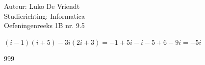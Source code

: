 \documentclass[a4paper]{article}
\begin{document}
\noindent \large Auteur: Luko De Vriendt\\
\noindent \large Studierichting: Informatica\\
\noindent \large Oefeningenreeks 1B nr. 9.5\\

\medskip

\normalsize

$(i-1)(i+5)-3i(2i+3) = -1 +5i -i -5 +6 -9i = -5i$ \\


\begin{thebibliography}{999}
\end{thebibliography}
\end{document}
